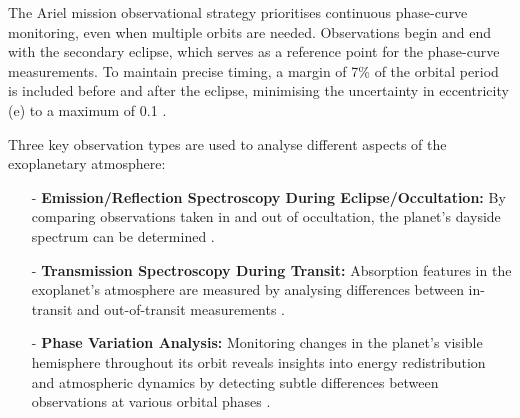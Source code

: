 \documentclass[12pt]{article}
\begin{document}
The Ariel mission observational strategy prioritises continuous phase-curve monitoring, even when multiple orbits are needed. Observations begin and end with the secondary eclipse, which serves as a reference point for the phase-curve measurements.
To maintain precise timing, a margin of 7\% of the orbital period is included before and after the eclipse, minimising the uncertainty in eccentricity (e) to a maximum of 0.1 \cite{salvignol2024ariel}.

Three key observation types are used to analyse different aspects of the exoplanetary atmosphere:

\begin{itemize}
    \item[-] \textbf{Emission/Reflection Spectroscopy During Eclipse/Occultation:} By comparing observations taken in and out of occultation, the planet's dayside spectrum can be determined \cite{salvignol2024ariel}.
    \item[-] \textbf{Transmission Spectroscopy During Transit:} Absorption features in the exoplanet's atmosphere are measured by analysing differences between in-transit and out-of-transit measurements \cite{salvignol2024ariel}.
    \item[-] \textbf{Phase Variation Analysis:} Monitoring changes in the planet's visible hemisphere throughout its orbit reveals insights into energy redistribution and atmospheric dynamics by detecting subtle differences between observations at various orbital phases \cite{salvignol2024ariel}.
\end{itemize}
\end{document}
